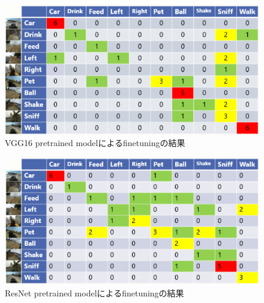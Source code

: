 \begin{figure}[htbp]
   \begin{center}
    
    \includegraphics[scale=0.3]{./Figures/vgg16_res.eps}
    \caption{VGG16 pretrained modelによるfinetuningの結果}
    \label{vgg16_res}
   \end{center}
\end{figure}
\begin{figure}[htbp]

   \begin{center}

    \includegraphics[scale=0.3]{./Figures/resnet_res.eps}
  \caption{ResNet pretrained modelによるfinetuningの結果}
  \label{resnet_res}
   \end{center}
\end{figure}

